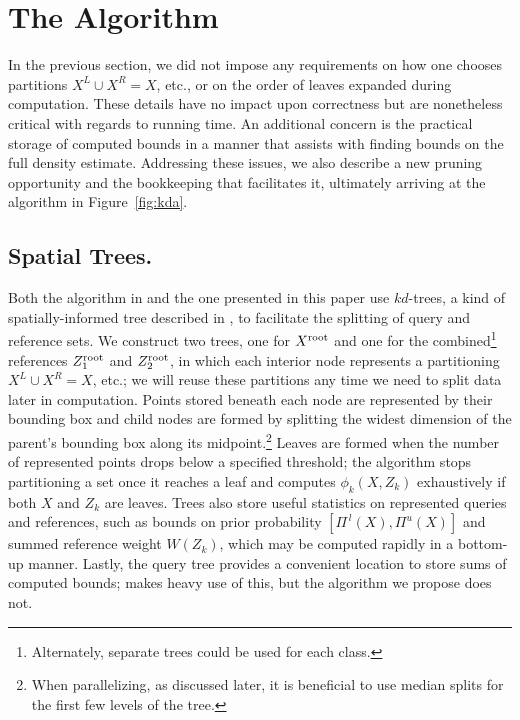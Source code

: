 \documentclass[twoside,leqno,twocolumn]{article}
\newcommand{\kdroot}[1]{#1^{\rm root}}
\newcommand{\kdleft}[1]{#1^{\!L}}
\newcommand{\kdright}[1]{#1^{\!R}}
\newcommand{\lo}[1]{#1^{\,l}}
\newcommand{\hi}[1]{#1^u}
\begin{document}
\section{The Algorithm}\label{sec:alg}
In the previous section, we did not impose any requirements on how one
chooses partitions $\kdleft{X} \cup \kdright{X} = X$, etc., or on the
order of leaves expanded during computation.  These details have no
impact upon correctness but are nonetheless critical with regards to
running time.  An additional concern is the practical storage of
computed bounds in a manner that assists with finding bounds on the
full density estimate.  Addressing these issues, we also describe a
new pruning opportunity and the bookkeeping that facilitates it,
ultimately arriving at the algorithm in Figure~\ref{fig:kda}.

\subsection{Spatial Trees.}
Both the algorithm in \cite{nbc-compstat} and the one presented in
this paper use $kd$-trees, a kind of spatially-informed tree described
in \cite{preparata}, to facilitate the splitting of query and
reference sets.  We construct two trees, one for $\kdroot{X}$ and one
for the combined\footnote{Alternately, separate trees could be used
for each class.} references $\kdroot{Z_1}$ and $\kdroot{Z_2}$, in
which each interior node represents a partitioning $\kdleft{X} \cup
\kdright{X} = X$, etc.; we will reuse these partitions any time we
need to split data later in computation.  Points stored beneath each
node are represented by their bounding box and child nodes are formed
by splitting the widest dimension of the parent's bounding box along
its midpoint.\footnote{When parallelizing, as discussed later, it is
beneficial to use median splits for the first few levels of the tree.}
Leaves are formed when the number of represented points drops below a
specified threshold; the algorithm stops partitioning a set once it
reaches a leaf and computes $\phi_k(X,Z_k)$ exhaustively if both $X$
and $Z_k$ are leaves.  Trees also store useful statistics on
represented queries and references, such as bounds on prior
probability $\left[ \lo{\Pi}(X), \hi{\Pi}(X) \right]$ and summed
reference weight $W(Z_k)$, which may be computed rapidly in a
bottom-up manner.  Lastly, the query tree provides a convenient
location to store sums of computed bounds; \cite{nbc-compstat} makes
heavy use of this, but the algorithm we propose does not.
\end{document}
